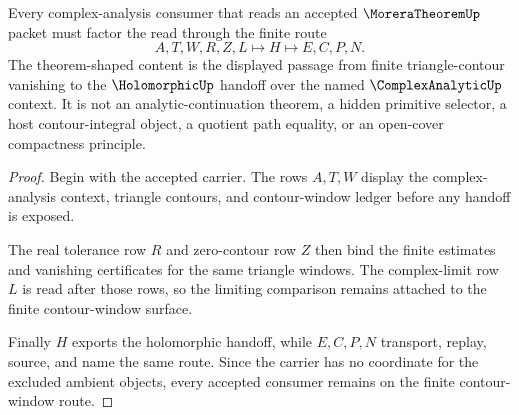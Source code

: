 \begin{theorem}
\label{thm:morera-theorem-contour-window-route}
Every complex-analysis consumer that reads an accepted $\MoreraTheoremUp$ packet must factor the read through the finite route
$$
A,T,W,R,Z,L \longmapsto H \longmapsto E,C,P,N .
$$
The theorem-shaped content is the displayed passage from finite triangle-contour vanishing to the $\HolomorphicUp$ handoff over the named $\ComplexAnalyticUp$ context. It is not an analytic-continuation theorem, a hidden primitive selector, a host contour-integral object, a quotient path equality, or an open-cover compactness principle.
\end{theorem}
\begin{proof}
Begin with the accepted carrier. The rows $A,T,W$ display the complex-analysis context, triangle contours, and contour-window ledger before any handoff is exposed.

The real tolerance row $R$ and zero-contour row $Z$ then bind the finite estimates and vanishing certificates for the same triangle windows. The complex-limit row $L$ is read after those rows, so the limiting comparison remains attached to the finite contour-window surface.

Finally $H$ exports the holomorphic handoff, while $E,C,P,N$ transport, replay, source, and name the same route. Since the carrier has no coordinate for the excluded ambient objects, every accepted consumer remains on the finite contour-window route.
\end{proof}





